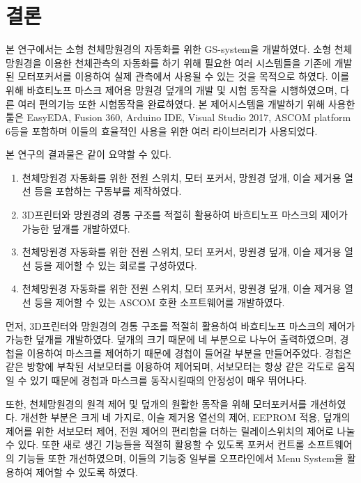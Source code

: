 \section{결론}
본 연구에서는 소형 천체망원경의 자동화를 위한 GS-system을 개발하였다. 
소형 천체망원경을 이용한 천체관측의 자동화를 하기 위해 필요한 여러 시스템들을 기존에 개발된 모터포커서를 이용하여 실제 관측에서 사용될 수 있는 것을 목적으로 하였다. 이를 위해 바흐티노프 마스크 제어용 망원경 덮개의 개발 및 시험 동작을 시행하였으며, 다른 여러 편의기능 또한 시험동작을 완료하였다. 본 제어시스템을 개발하기 위해 사용한 툴은 EasyEDA, Fusion 360, Arduino IDE, Visual Studio 2017, ASCOM platform 6등을 포함하며 이들의 효율적인 사용을 위한 여러 라이브러리가 사용되었다.

본 연구의 결과물은 같이 요약할 수 있다. 

\begin{enumerate}
	
	\item 천체망원경 자동화를 위한 전원 스위치, 모터 포커서, 망원경 덮개, 이슬 제거용 열선 등을 포함하는 구동부를 제작하였다. 
	
		\item 3D프린터와 망원경의 경통 구조를 적절히 활용하여 바흐티노프 마스크의 제어가 가능한 덮개를 개발하였다.
	
	
	\item 천체망원경 자동화를 위한 전원 스위치, 모터 포커서, 망원경 덮개, 이슬 제거용 열선 등을 제어할 수 있는 회로를 구성하였다.
	
	\item 천체망원경 자동화를 위한 전원 스위치, 모터 포커서, 망원경 덮개, 이슬 제거용 열선 등을 제어할 수 있는 ASCOM 호환 소프트웨어를 개발하였다.
	
	
\end{enumerate}

먼저, 3D프린터와 망원경의 경통 구조를 적절히 활용하여 바흐티노프 마스크의 제어가 가능한 덮개를 개발하였다. 덮개의 크기 때문에 네 부분으로 나누어 출력하였으며, 경첩을 이용하여 마스크를 제어하기 때문에 경첩이 들어갈 부분을 만들어주었다. 경첩은 같은 방향에 부착된 서보모터를 이용하여 제어되며, 서보모터는 항상 같은 각도로 움직일 수 있기 때문에 경첩과 마스크를 동작시킬때의 안정성이 매우 뛰어나다.

또한, 천체망원경의 원격 제어 및 덮개의 원활한 동작을 위해 모터포커서를 개선하였다. 개선한 부분은 크게 네 가지로, 이슬 제거용 열선의 제어, EEPROM 적용, 덮개의 제어를 위한 서보모터 제어, 전원 제어의 편리함을 더하는 릴레이스위치의 제어로 나눌 수 있다. 또한 새로 생긴 기능들을 적절히 활용할 수 있도록 포커서 컨트롤 소프트웨어의 기능들 또한 개선하였으며, 이들의 기능중 일부를 오프라인에서 Menu System을 활용하여 제어할 수 있도록 하였다.

